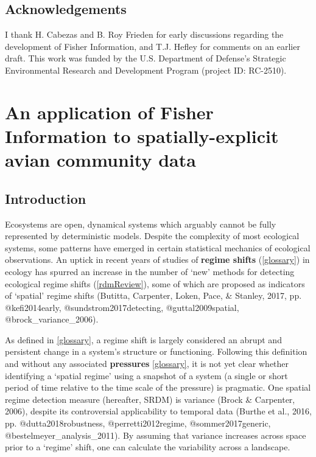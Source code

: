 \documentclass[12pt,twoside,openany]{reedthesis}
\begin{document}
\hypertarget{acknowledgements}{%
\section{Acknowledgements}\label{acknowledgements}}

I thank H. Cabezas and B. Roy Frieden for early discussions regarding the development of Fisher Information, and T.J. Hefley for comments on an earlier draft. This work was funded by the U.S. Department of Defense's Strategic Environmental Research and Development Program (project ID: RC-2510).

\hypertarget{fisherSpatial}{%
\chapter{An application of Fisher Information to spatially-explicit avian community data}\label{fisherSpatial}}

\hypertarget{introduction-2}{%
\section{Introduction}\label{introduction-2}}

Ecosystems are open, dynamical systems which arguably cannot be fully represented by deterministic models. Despite the complexity of most ecological systems, some patterns have emerged in certain statistical mechanics of ecological observations. An uptick in recent years of studies of \textbf{regime shifts} (\ref{glossary}) in ecology has spurred an increase in the number of `new' methods for detecting ecological regime shifts (\ref{rdmReview}), some of which are proposed as indicators of `spatial' regime shifts (Butitta, Carpenter, Loken, Pace, \& Stanley, 2017, pp. @kefi2014early, @sundstrom2017detecting, @guttal2009spatial, @brock\_variance\_2006).

As defined in \ref{glossary}, a regime shift is largely considered an abrupt and persistent change in a system's structure or functioning. Following this definition and without any associated \textbf{pressures} \ref{glossary}, it is not yet clear whether identifying a `spatial regime' using a snapshot of a system (a single or short period of time relative to the time scale of the pressure) is pragmatic. One spatial regime detection measure (hereafter, SRDM) is variance (Brock \& Carpenter, 2006), despite its controversial applicability to temporal data (Burthe et al., 2016, pp. @dutta2018robustness, @perretti2012regime, @sommer2017generic, @bestelmeyer\_analysis\_2011). By assuming that variance increases across space prior to a `regime' shift, one can calculate the variability across a landscape.
\end{document}
